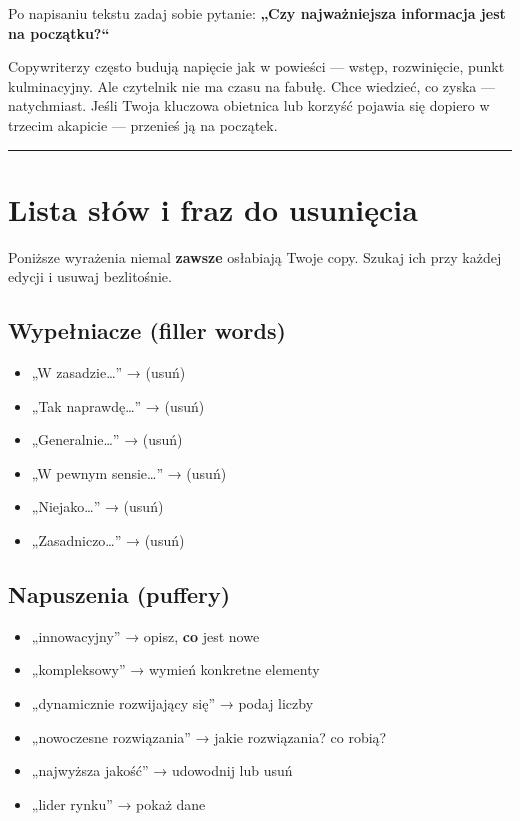 \documentclass[
  12pt,
  a4paper,
  twoside,
  openright,
  12pt,
  DIV=12,
  BCOR=12mm]{scrbook}
\providecommand{\tightlist}{%
  \setlength{\itemsep}{0pt}\setlength{\parskip}{0pt}}\usepackage{longtable,booktabs,array}
\newcommand{\decoline}{%
  \begin{center}
    \textcolor{bordergray}{\rule{0.3\textwidth}{0.5pt}}
  \end{center}
}
\begin{document}
Po napisaniu tekstu zadaj sobie pytanie: \textbf{„Czy najważniejsza
informacja jest na początku?{}``}

Copywriterzy często budują napięcie jak w powieści --- wstęp,
rozwinięcie, punkt kulminacyjny. Ale czytelnik nie ma czasu na fabułę.
Chce wiedzieć, co zyska --- natychmiast. Jeśli Twoja kluczowa obietnica
lub korzyść pojawia się dopiero w trzecim akapicie --- przenieś ją na
początek.

\decoline

\section{Lista słów i fraz do
usunięcia}\label{lista-sux142uxf3w-i-fraz-do-usuniux119cia}

Poniższe wyrażenia niemal \textbf{zawsze} osłabiają Twoje copy. Szukaj
ich przy każdej edycji i usuwaj bezlitośnie.

\subsection{Wypełniacze (filler
words)}\label{wypeux142niacze-filler-words}

\begin{itemize}
\tightlist
\item
  „W zasadzie\ldots'' → (usuń)
\item
  „Tak naprawdę\ldots'' → (usuń)
\item
  „Generalnie\ldots'' → (usuń)
\item
  „W pewnym sensie\ldots'' → (usuń)
\item
  „Niejako\ldots'' → (usuń)
\item
  „Zasadniczo\ldots'' → (usuń)
\end{itemize}

\subsection{Napuszenia (puffery)}\label{napuszenia-puffery}

\begin{itemize}
\tightlist
\item
  „innowacyjny'' → opisz, \textbf{co} jest nowe
\item
  „kompleksowy'' → wymień konkretne elementy
\item
  „dynamicznie rozwijający się'' → podaj liczby
\item
  „nowoczesne rozwiązania'' → jakie rozwiązania? co robią?
\item
  „najwyższa jakość'' → udowodnij lub usuń
\item
  „lider rynku'' → pokaż dane
\end{itemize}
\end{document}
